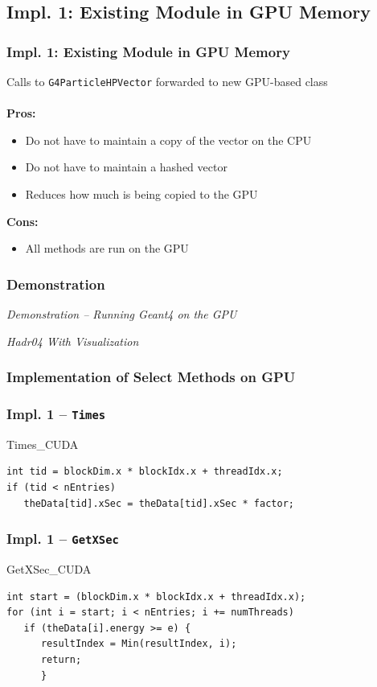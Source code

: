 \documentclass{beamer}
\newcommand\pro{\item[$+$]}
\newcommand\con{\item[$-$]}
\begin{document}
\subsection{Impl. 1: Existing Module in GPU Memory}
\begin{frame}
\frametitle{Impl. 1: Existing Module in GPU Memory}
Calls to \texttt{G4ParticleHPVector} forwarded to new GPU-based class\\~\\ %

\textbf{Pros:}
\begin{itemize}
\pro Do not have to maintain a copy of the vector on the CPU
\pro Do not have to maintain a hashed vector
\pro Reduces how much is being copied to the GPU
\end{itemize}
\textbf{Cons:}
\begin{itemize}
\con All methods are run on the GPU
\end{itemize}
\end{frame}

\begin{frame}
\frametitle{Demonstration}
\begin{center}
\emph{Demonstration -- Running Geant4 on the GPU}

\emph{Hadr04 With Visualization}

\end{center}
\end{frame}

\subsubsection{Implementation of Select Methods on GPU}
\begin{frame}[fragile]
\frametitle{Impl. 1 -- \texttt{Times}}
\begin{block}{Times\_CUDA}
\begin{lstlisting} 
int tid = blockDim.x * blockIdx.x + threadIdx.x;
if (tid < nEntries) 
   theData[tid].xSec = theData[tid].xSec * factor;    
\end{lstlisting}
\end{block}
\end{frame}

\begin{frame}[fragile]
\frametitle{Impl. 1 -- \texttt{GetXSec}}
\begin{block}{GetXSec\_CUDA}
\begin{lstlisting}
int start = (blockDim.x * blockIdx.x + threadIdx.x);
for (int i = start; i < nEntries; i += numThreads) 
   if (theData[i].energy >= e) {
      resultIndex = Min(resultIndex, i);
      return;
      }
\end{lstlisting}
\end{block}
\end{frame}
\end{document}
